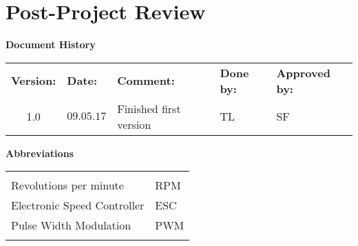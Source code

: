 \cleartoleftpage
{
\Hide
\part{Post-Project Review}
}

\begin{center}
\textbf{\large Document History}\\
\begin{tabular}{cllll}
\rowcolor{cadetgrey}
\textbf{Version:}    &\textbf{Date:} 	 &\textbf{Comment:}    &\textbf{Done by:}   &\textbf{Approved by:}  \\
1.0       & $09.05.17$   & Finished first version  & TL  & SF \\ 
\end{tabular}                                                                   
\end{center}

\vspace*{3.0 cm}

\begin{center}
\textbf{\large Abbreviations}\\
\begin{tabular}{ll}
\rowcolor{cadetgrey}
    &   \\
Revolutions per minute      & RPM          \\ \rowcolor{gainsboro}
Electronic Speed Controller & ESC \\ 
Pulse Width Modulation  & PWM \\ \rowcolor{gainsboro}

\end{tabular}                                                             
\end{center}

\newpage



\setcounter{section}{0}
\setcounter{secnumdepth}{2}

\startcontents  
\setcounter{tocdepth}{2}
\chapter*{\contentsname}

\vspace*{1cm}

\vspace*{1cm}




\newpage


\newpage


\newpage


\newpage


\newpage


\stopcontents
{}


